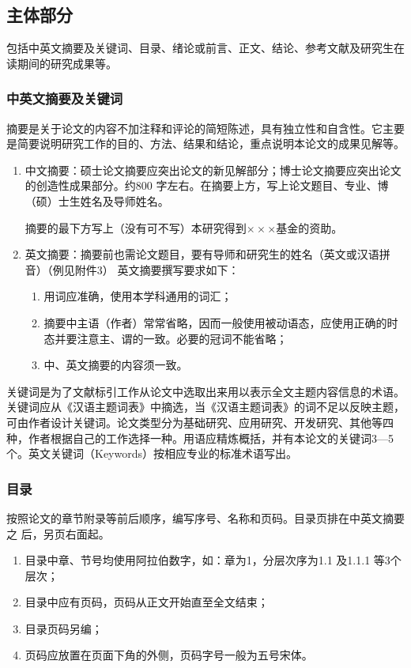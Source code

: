 \subsection{主体部分}
包括中英文摘要及关键词、目录、绪论或前言、正文、结论、参考文献及研究生在读期间的研究成果等。
\subsubsection{中英文摘要及关键词}
摘要是关于论文的内容不加注释和评论的简短陈述，具有独立性和自含性。它主要是简要说明研究工作的目的、方法、结果和结论，重点说明本论文的成果见解等。

\begin{enumerate}[1)]
    \item 中文摘要：硕士论文摘要应突出论文的新见解部分；博士论文摘要应突出论文的创造性成果部分。约800 字左右。在摘要上方，写上论文题目、专业、博（硕）士生姓名及导师姓名。
    
    摘要的最下方写上（没有可不写）本研究得到$\times\times\times$基金的资助。
    \item 英文摘要：摘要前也需论文题目，要有导师和研究生的姓名（英文或汉语拼音）（例见附件3）
    英文摘要撰写要求如下：
    \begin{enumerate}
        \item 用词应准确，使用本学科通用的词汇；
        \item 摘要中主语（作者）常常省略，因而一般使用被动语态，应使用正确的时态并要注意主、谓的一致。必要的冠词不能省略；
        \item 中、英文摘要的内容须一致。
    \end{enumerate}
\end{enumerate}

关键词是为了文献标引工作从论文中选取出来用以表示全文主题内容信息的术语。关键词应从《汉语主题词表》中摘选，当《汉语主题词表》的词不足以反映主题，可由作者设计关键词。论文类型分为基础研究、应用研究、开发研究、其他等四种，作者根据自己的工作选择一种。用语应精炼概括，并有本论文的关键词3—5 个。英文关键词（Keywords）按相应专业的标准术语写出。

\subsubsection{目录}
按照论文的章节附录等前后顺序，编写序号、名称和页码。目录页排在中英文摘要之
后，另页右面起。
\begin{enumerate}[1)]
    \item 目录中章、节号均使用阿拉伯数字，如：章为1，分层次序为1.1 及1.1.1 等3个层次；
    \item 目录中应有页码，页码从正文开始直至全文结束；
    \item 目录页码另编；
    \item 页码应放置在页面下角的外侧，页码字号一般为五号宋体。
\end{enumerate}

